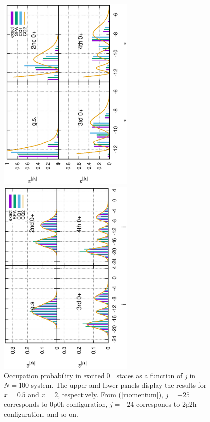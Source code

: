 \documentclass[%
superscriptaddress,
preprint,
showpacs,
nofootinbib,
amsmath,amssymb,
prc,
floatfix ]%
{revtex4-1}
\begin{document}
\begin{figure}[htbp]
 \begin{minipage}{1\hsize}
 \begin{center}
  \includegraphics[width=67mm,angle=-90]{images/N100Xeq0p5occ.eps}
 \end{center}
 \end{minipage}
 \begin{minipage}{1\hsize}
 \begin{center}
  \includegraphics[width=67mm,angle=-90]{images/N100Xeq2occ.eps}
 \end{center}
 \end{minipage}
 \caption{Occupation probability in excited $0^+$ states as a function of $j$ in $N=100$ system. The upper and lower panels display the results for $x=0.5$ and $x=2$, respectively. From (\ref{momentum}), $j=-25$ corresponds to 0p0h configuration, $j=-24$ corresponds to 2p2h configuration, and so on.}
 \label{fig:N100_occ}
\end{figure}
\end{document}
